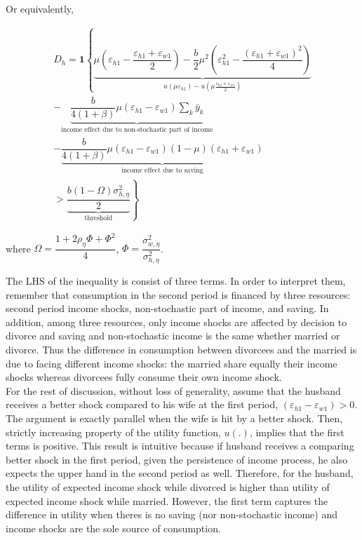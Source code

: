 Or equivalently, 

\begin{align}
D_h = \mathbf  1  \left  \{ \underbrace{  \mu (\varepsilon_{h1} - \dfrac{\varepsilon_{h1} + \varepsilon_{w1}}{2} ) - \dfrac{b}{2} \mu^2 (\varepsilon^2_{h1} - \dfrac{(\varepsilon_{h1} + \varepsilon_{w1})^2}{4})}_{u(\mu \varepsilon_{h1}) - u(\mu \frac{\varepsilon_{h1} + \varepsilon_{w1}}{2})} \right. \nonumber \\
\left.   - \underbrace{  \dfrac{b }{4(1+\beta)}  \mu (\varepsilon_{h1} - \varepsilon_{w1})   \sum_k \bar y_k }_{\text{income effect due to non-stochastic part of income}}\right. \nonumber \\
\left.   -  \underbrace{\dfrac{b }{4(1+\beta)} \mu (\varepsilon_{h1} - \varepsilon_{w1}) (1-\mu) (\varepsilon_{h1} + \varepsilon_{w1})}_{\text{income effect due to saving}}  \right.  \nonumber \\ 
 \left.     >  \underbrace{\dfrac{b  (1- \Omega )\sigma^2_{h,\eta}}{2}}_{\text{threshold}}   \right \}
\end{align}

 where  $\Omega = \dfrac{1 + 2\rho_\eta \Phi+ \Phi^2}{4}$, $\Phi = \dfrac{\sigma^2_{w,\eta}}{\sigma^2_{h,\eta}}$. %

The LHS of the inequality is consist of three terms. In order to interpret them, remember that consumption in the second period is financed by three resources: second period income shocks, non-stochastic part of income, and saving. In addition, among three resources, only income shocks are affected by decision to divorce and saving and non-stochastic income is the same whether married or divorce. Thus the difference in consumption between divorcees and the married is due to facing different income shocks: the married share equally their income shocks whereas divorcees fully consume their own income shock. \\

For the rest of discussion, without loss of generality, assume that the husband receives a better shock compared to his wife at the first period, $ (\varepsilon_{h1} - \varepsilon_{w1}) > 0$. The argument is exactly parallel when the wife is hit by a better shock. Then, strictly increasing property of the utility function, $u(.)$, implies that the first terms is positive. This result is intuitive because if husband receives a comparing better shock in the first period, given the persistence of income process, he also expects the upper hand in the second period as well. Therefore, for the husband, the utility of expected income shock while divorced is higher than utility of expected income shock while married. However, the first term captures the difference in utility when theres is no saving (nor non-stochastic income) and income shocks are the sole source of consumption. \\

